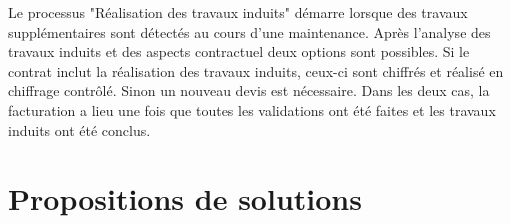 \documentclass[]{scrartcl}
\begin{document}
Le processus "Réalisation des travaux induits" démarre lorsque des travaux supplémentaires sont détectés au cours d'une maintenance. Après l'analyse des travaux induits et des aspects contractuel deux options sont possibles. Si le contrat inclut la réalisation des travaux induits, ceux-ci sont chiffrés et réalisé en chiffrage contrôlé. Sinon un nouveau devis est nécessaire. Dans les deux cas, la facturation a lieu une fois que toutes les validations ont été faites et les travaux induits ont été conclus.


\section{Propositions de solutions}
\end{document}
